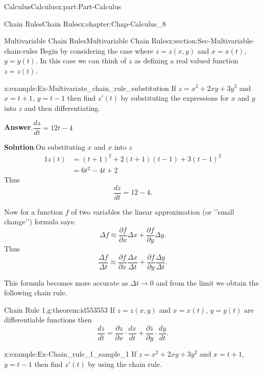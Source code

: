 \documentclass[oneside,10pt,]{book}
\newcommand{\blocktitlefont}{\relax}
\numberwithin{equation}{section}
\newcommand{\amp}{&}
\begin{document}
\begin{partptx}{Calculus}{}{Calculus}{}{}{x:part:Part-Calculus}
\begin{chapterptx}{Chain Rules}{}{Chain Rules}{}{}{x:chapter:Chap-Calculus_8}
\begin{sectionptx}{Multivariable Chain Rules}{}{Multivariable Chain Rules}{}{}{x:section:Sec-Multivariable-chain-rules}
Begin by considering the case where \(z=z(x,y)\) and \(x=x(t)\), \(y=y(t)\). In this case we can think of \(z\) as defining a real valued function \(z=z(t)\).%
\begin{example}{}{x:example:Ex-Multivariate_chain_rule_substitution}%
If \(z=x^2+2xy+3y^2\) and \(x=t+1\), \(y=t-1\) then find \(z'(t)\) by substituting the expressions for \(x\) and \(y\) into \(z\) and then differentiating.%
\par\smallskip%
\noindent\textbf{\blocktitlefont Answer}.\hypertarget{g:answer:id553530}{}\quad{}\(\dfrac{dz}{dt} = 12t-4\)%
\par\smallskip%
\noindent\textbf{\blocktitlefont Solution}.\hypertarget{g:solution:id553502}{}\quad{}On substituting \(x\) and \(x\) into \(z\)%
\begin{alignat*}{1}
z(t) \amp = (t+1)^2 + 2(t+1)(t-1)+3(t-1)^2\\
\quad \amp = 6t^2-4t+2
\end{alignat*}
Thus%
\begin{equation*}
\dfrac{dz}{dt} = 12-4.
\end{equation*}
%
\end{example}
Now for a function \(f\) of two variables the linear approximation (or '{}'{}small change'{}'{}) formula says:%
\begin{equation*}
\Delta f \approx \dfrac{\partial f}{\partial x}\Delta x + \dfrac{\partial f}{\partial y}\Delta y.
\end{equation*}
Thus%
\begin{equation*}
\dfrac{\Delta f}{\Delta t} \approx \dfrac{\partial f}{\partial x}\frac{\Delta x}{\Delta t} + \dfrac{\partial f}{\partial y}\frac{\Delta y}{\Delta t}.
\end{equation*}
%
\par
This formula becomes more accurate as \(\Delta t \to 0\) and from the limit we obtain the following chain rule.%
\begin{theorem}{Chain Rule 1.}{}{g:theorem:id553553}%
If \(z=z(x,y)\) and \(x=x(t)\), \(y=y(t)\) are differentiable functions then%
\begin{equation*}
\dfrac{dz}{dt} = \dfrac{\partial z}{\partial x}\cdot \dfrac{dx}{dt} + \dfrac{\partial z}{\partial y}\cdot \dfrac{dy}{dt}.
\end{equation*}
%
\end{theorem}
\begin{example}{}{x:example:Ex-Chain_rule_1_sample_1}%
If \(z=x^2+2xy+3y^2\) and \(x=t+1\), \(y=t-1\) then find \(z'(t)\) by using the chain rule.%

\end{example}
\end{sectionptx}
\end{chapterptx}
\end{partptx}
\end{document}
